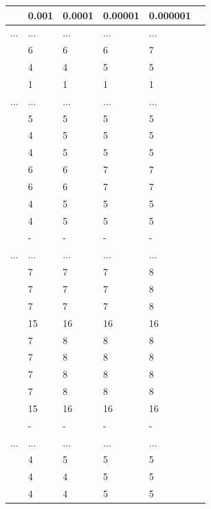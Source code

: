 \documentclass{article}
\begin{document}
\begin{table}[H]
    \centering
    \begin{tabular}{|l|l|l|l|l|l|}
    \hline
    & 0.001 & 0.0001 & 0.00001 & 0.000001 \\ \hline
    ... & ... & ... & ... & ...\\ \hline
    [-1.0, 1.0, 0.2] & 6 & 6 & 6 & 7 \\ \hline
    [-1.0, 1.0, 0.6] & 4 & 4 & 5 & 5 \\ \hline
    [-1.0, 1.0, 1.0] & 1 & 1 & 1 & 1 \\ \hline
    ... & ... & ... & ... & ...\\ \hline
    [-0.6, 0.6, 1.0] & 5 & 5 & 5 & 5 \\ \hline
    [-0.6, 1.0, -1.0] & 4 & 5 & 5 & 5 \\ \hline
    [-0.6, 1.0, -0.6] & 4 & 5 & 5 & 5 \\ \hline
    [-0.6, 1.0, -0.2] & 6 & 6 & 7 & 7 \\ \hline
    [-0.6, 1.0, 0.2] & 6 & 6 & 7 & 7 \\ \hline
    [-0.6, 1.0, 0.6] & 4 & 5 & 5 & 5 \\ \hline
    [-0.6, 1.0, 1.0] & 4 & 5 & 5 & 5 \\ \hline
    [-0.2, -1.0, -1.0] & - & - & - & - \\ \hline
    ... & ... & ... & ... & ...\\ \hline
    [-0.2, 0.6, 0.2] & 7 & 7 & 7 & 8 \\ \hline
    [-0.2, 0.6, 0.6] & 7 & 7 & 7 & 8 \\ \hline
    [-0.2, 0.6, 1.0] & 7 & 7 & 7 & 8 \\ \hline
    [-0.2, 1.0, -1.0] & 15 & 16 & 16 & 16 \\ \hline
    [-0.2, 1.0, -0.6] & 7 & 8 & 8 & 8 \\ \hline
    [-0.2, 1.0, -0.2] & 7 & 8 & 8 & 8 \\ \hline
    [-0.2, 1.0, 0.2] & 7 & 8 & 8 & 8 \\ \hline
    [-0.2, 1.0, 0.6] & 7 & 8 & 8 & 8 \\ \hline
    [-0.2, 1.0, 1.0] & 15 & 16 & 16 & 16 \\ \hline
    [0.2, -1.0, -1.0] & - & - & - & - \\ \hline
    ... & ... & ... & ... & ...\\ \hline
    [0.2, 0.6, 1.0] & 4 & 5 & 5 & 5 \\ \hline
    [0.2, 1.0, -1.0] & 4 & 4 & 5 & 5 \\ \hline
    [0.2, 1.0, -0.6] & 4 & 4 & 5 & 5 \\ \hline

\end{tabular}
\end{table}
\end{document}
